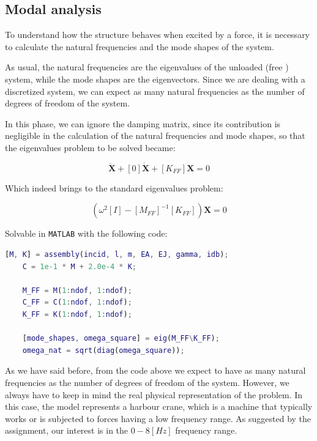 \subsection{Modal analysis}
\label{sub:modal_analysis}

To understand how the structure behaves when excited by a force, it is necessary to calculate the natural frequencies and the mode shapes of the system.

As usual, the natural frequencies are the eigenvalues of the unloaded (free ) system, while the mode shapes are the eigenvectors.
Since we are dealing with a discretized system, we can expect as many natural frequencies as the number of degrees of freedom of the system.

In this phase, we can ignore the damping matrix, since its contribution is negligible in the calculation of the natural frequencies and mode shapes, so that the eigenvalues problem to be solved became:

\begin{equation}
    [M_{FF}] \mathbf{\ddot{X}} + [0] \mathbf{\dot{X}} + [K_{FF}] \mathbf{X} = 0
\end{equation}

Which indeed brings to the standard eigenvalues problem:

\begin{equation}
    (\omega^2 [I] - [M_{FF}]^{-1} [K_{FF}]) \mathbf{X} = 0
\end{equation}

Solvable in \texttt{MATLAB} with the following code:

\begin{lstlisting}[language=Matlab, caption={MATLAB code to compute the natural frequencies and mode shapes of the system.}]
    [M, K] = assembly(incid, l, m, EA, EJ, gamma, idb);
    C = 1e-1 * M + 2.0e-4 * K;

    M_FF = M(1:ndof, 1:ndof);
    C_FF = C(1:ndof, 1:ndof);
    K_FF = K(1:ndof, 1:ndof);

    [mode_shapes, omega_square] = eig(M_FF\K_FF);
    omega_nat = sqrt(diag(omega_square));
\end{lstlisting}

As we have said before, from the code above we expect to have as many natural frequencies as the number of degrees of freedom of the system.
However, we always have to keep in mind the real physical representation of the problem.
In this case, the model represents a harbour crane, which is a machine that typically works or is subjected to forces having a low frequency range.
As suggested by the assignment, our interest is in the $0-8 [Hz]$ frequency range.

